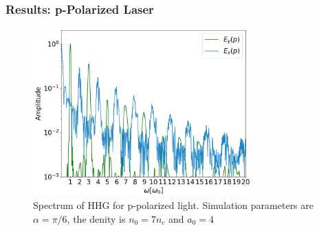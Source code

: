 \documentclass{beamer}
\begin{document}
\begin{frame}
    \frametitle{Results: p-Polarized Laser}
    \begin{figure}[h]
        \centering
        \includegraphics[width=0.75\textwidth]{images/p_fft.png}
        \caption{\small{Spectrum of HHG for p-polarized light. Simulation parameters are $\alpha = \pi/6$, the denity is $n_0 = 7n_c$ and $a_0 = 4$}}
    \end{figure}
\end{frame}
\end{document}
